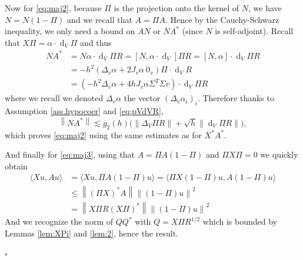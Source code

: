 \documentclass[12pt]{amsart}
\def\<{\langle}
\def\>{\rangle}
\newcommand{\ep}{\hfill $\square$}
\renewcommand{\d}{\operatorname{d}}
\numberwithin{equation}{section}
\numberwithin{figure}{section}
\DeclareMathOperator{\p}{\partial}
\newcommand{\vvert}[1]{\left\lVert#1\right\rVert}
\begin{document}
Now for \eqref{eq:maj2}, because $\Pi$ is the projection onto the kernel of $N$, %
we have $N = N(1-\Pi)$ and we recall that $A = \Pi A$. Hence by the Cauchy-Schwarz inequality, we only need a bound on $AN$ or $NA^*$ (since $N$ is self-adjoint). Recall %
that $X\Pi = \alpha\cdot\d_V\Pi$ and thus
\begin{equation*}
\begin{aligned}
    NA^* &= N\alpha\cdot\d_V\Pi R = [N,\alpha\cdot\d_V]\Pi R = [N,\alpha]\cdot\d_V\Pi R\\
    &= -h^2(\Delta_v\alpha + 2J_v\alpha\p_v)\Pi\cdot\d_V R\\
    &= (-h^2\Delta_v\alpha + 4hJ_v\alpha\Sigma^T\Sigma v)\cdot\d_V\Pi R
\end{aligned}
\end{equation*}
where we recall we denoted $\Delta_v\alpha$ the vector $(\Delta_v\alpha_i)_i$. Therefore thanks to Assumption \ref{ass.hypocoer} and \eqref{eq:pVdVR},
\begin{equation*}
\vvert{NA^*} \lesssim g_2(h)\big(\vvert{\Delta_V\Pi R} + \sqrt{h}\vvert{\d_V\Pi R}\big),
\end{equation*}
which proves \eqref{eq:maj2} using the same estimates as for $X^*A^*$.

And finally for \eqref{eq:maj3}, using that $A = \Pi A (1-\Pi)$ and $\Pi X \Pi = 0$ we quickly obtain
\begin{equation*}
\begin{aligned}
    \<Xu,Au\> &= \<Xu,\Pi A(1-\Pi)u\> = \<\Pi X(1-\Pi)u,A(1-\Pi)u\>\\
    &\leq \vvert{(\Pi X)^*A}\vvert{(1-\Pi)u}^2\\
    &= \vvert{X\Pi R(X\Pi)^*}\vvert{(1-\Pi)u}^2
\end{aligned}
\end{equation*}
And we recognize the norm of $QQ^*$ with $Q = X\Pi R^{1/2}$ which is bounded by Lemmas \ref{lem:XPi} and \ref{lem:2}, hence the result.

\ep
\end{document}
